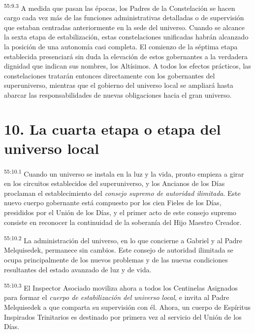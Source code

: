 \par
\textsuperscript{55:9.3} A medida que pasan las épocas, los Padres de la Constelación se hacen cargo cada vez más de las funciones administrativas detalladas o de supervisión que estaban centradas anteriormente en la sede del universo. Cuando se alcance la sexta etapa de estabilización, estas constelaciones unificadas habrán alcanzado la posición de una autonomía casi completa. El comienzo de la séptima etapa establecida presenciará sin duda la elevación de estos gobernantes a la verdadera dignidad que indican sus nombres, los Altísimos. A todos los efectos prácticos, las constelaciones tratarán entonces directamente con los gobernantes del superuniverso, mientras que el gobierno del universo local se ampliará hasta abarcar las responsabilidades de nuevas obligaciones hacia el gran universo.

\section*{10. La cuarta etapa o etapa del universo local}
\par
\textsuperscript{55:10.1} Cuando un universo se instala en la luz y la vida, pronto empieza a girar en los circuitos establecidos del superuniverso, y los Ancianos de los Días proclaman el establecimiento del \textit{consejo supremo de autoridad ilimitada}. Este nuevo cuerpo gobernante está compuesto por los cien Fieles de los Días, presididos por el Unión de los Días, y el primer acto de este consejo supremo consiste en reconocer la continuidad de la soberanía del Hijo Maestro Creador.

\par
\textsuperscript{55:10.2} La administración del universo, en lo que concierne a Gabriel y al Padre Melquisedek, permanece sin cambios. Este consejo de autoridad ilimitada se ocupa principalmente de los nuevos problemas y de las nuevas condiciones resultantes del estado avanzado de luz y de vida.

\par
\textsuperscript{55:10.3} El Inspector Asociado moviliza ahora a todos los Centinelas Asignados para formar el \textit{cuerpo de estabilización del universo local}, e invita al Padre Melquisedek a que comparta su supervisión con él. Ahora, un cuerpo de Espíritus Inspirados Trinitarios es destinado por primera vez al servicio del Unión de los Días.

